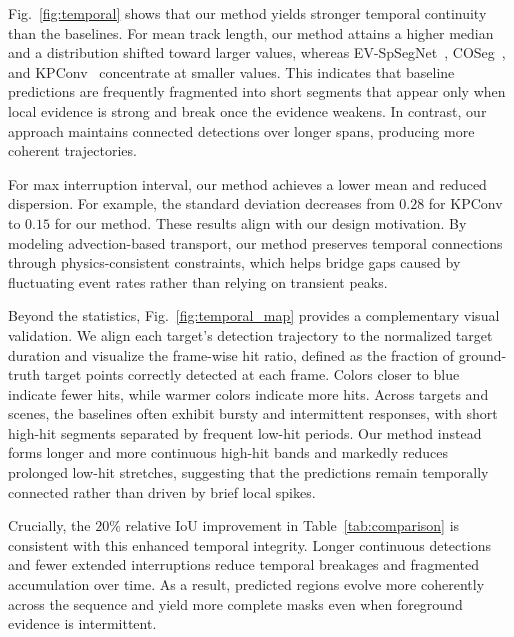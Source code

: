 \documentclass[runningheads]{llncs}
\begin{document}
Fig.~\ref{fig:temporal} shows that our method yields stronger temporal continuity than the baselines.
For mean track length, our method attains a higher median and a distribution shifted toward larger values, whereas EV-SpSegNet~\cite{chen2025event}, COSeg~\cite{an2024rethinking}, and KPConv~\cite{thomas2019kpconv} concentrate at smaller values.
This indicates that baseline predictions are frequently fragmented into short segments that appear only when local evidence is strong and break once the evidence weakens.
In contrast, our approach maintains connected detections over longer spans, producing more coherent trajectories.

For max interruption interval, our method achieves a lower mean and reduced dispersion.
For example, the standard deviation decreases from $0.28$ for KPConv~\cite{thomas2019kpconv} to $0.15$ for our method.
These results align with our design motivation.
By modeling advection-based transport, our method preserves temporal connections through physics-consistent constraints, which helps bridge gaps caused by fluctuating event rates rather than relying on transient peaks.

Beyond the statistics, Fig.~\ref{fig:temporal_map} provides a complementary visual validation.
We align each target’s detection trajectory to the normalized target duration and visualize the frame-wise hit ratio, defined as the fraction of ground-truth target points correctly detected at each frame.
Colors closer to blue indicate fewer hits, while warmer colors indicate more hits.
Across targets and scenes, the baselines often exhibit bursty and intermittent responses, with short high-hit segments separated by frequent low-hit periods.
Our method instead forms longer and more continuous high-hit bands and markedly reduces prolonged low-hit stretches, suggesting that the predictions remain temporally connected rather than driven by brief local spikes.

Crucially, the $20\%$ relative IoU improvement in Table~\ref{tab:comparison} is consistent with this enhanced temporal integrity.
Longer continuous detections and fewer extended interruptions reduce temporal breakages and fragmented accumulation over time.
As a result, predicted regions evolve more coherently across the sequence and yield more complete masks even when foreground evidence is intermittent.

\end{document}

